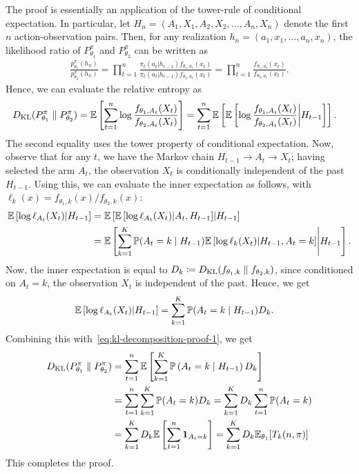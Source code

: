 \documentclass[12pt]{article}
\begin{document}
The proof is essentially an application of the tower-rule of conditional expectation. In particular, let $H_n = (A_1, X_1, A_2, X_2, \ldots, A_n, X_n)$ denote the first $n$ action-observation pairs. Then, for any realization $h_n = (a_1, x_1, \ldots, a_n, x_n)$, the likelihood ratio of $P_{\theta_1}^{\pi}$ and $P_{\theta_2}^{\pi}$ can be written as 
\begin{align}
\frac{p_{\theta_1}^{\pi}(h_n)}{p_{\theta_2}^{\pi}(h_n)} = \prod_{t=1}^n \frac{\pi_t(a_t|h_{t-1}) f_{\theta_1, a_t}(x_t)}{\pi_t(a_t|h_{t-1}) f_{\theta_2, a_t}(x_t)} = \prod_{t=1}^n \frac{f_{\theta_1, a_t}(x_t)}{f_{\theta_2, a_t}(x_t)}. 
\end{align}
Hence, we can evaluate the relative entropy as 
\begin{align}
D_{\text{KL}}(P_{\theta_1}^{\pi} \parallel P_{\theta_2}^{\pi}) &= \mathbb{E}\left[ \sum_{t=1}^n \log  \frac{f_{\theta_1, A_t}(X_t)}{f_{\theta_2, A_t}(X_t)}  \right] 
 = \sum_{t=1}^n \mathbb{E}\left[ \mathbb{E}\left[\log \frac{f_{\theta_1, A_t}(X_t)}{f_{\theta_2, A_t}(X_t)}  \middle \vert H_{t-1} \right] \right].  
 \label{eq:kl-decomposition-proof-1}
\end{align}
The second equality uses the tower property of conditional expectation. Now, observe that for any $t$, we have the Markov chain $H_{t-1} \longrightarrow A_t \longrightarrow X_t$; having selected the arm $A_t$, the observation $X_t$ is conditionally independent of the  past $H_{t-1}$.  Using this, we can evaluate the inner expectation as follows, with $\ell_k(x) = f_{\theta_1, k}(x)/f_{\theta_2, k}(x)$: 
\begin{align}
	\mathbb{E}\left[ \log \ell_{A_t}(X_t) \middle \vert H_{t-1}\right] &= \mathbb{E}\left[ \mathbb{E}\left[ \log \ell_{A_t}(X_t) \middle \vert A_t, H_{t-1} \right] \middle \vert H_{t-1} \right] \\
	&= \mathbb{E} \left[ \sum_{k=1}^K \mathbb{P}(A_t=k \mid H_{t-1}) \mathbb{E}\left[  \log \ell_k(X_t) \middle \vert H_{t-1}, A_t=k\right] \middle  \vert H_{t-1}\right]. 
\end{align}
Now, the inner expectation is equal to $D_k \coloneqq D_{\text{KL}}(f_{\theta_1, k} \parallel f_{\theta_2, k})$, since conditioned on $A_t=k$, the observation $X_t$ is independent of the past. Hence, we get 
\begin{align}
\mathbb{E}\left[ \log \ell_{A_t}(X_t) \middle \vert H_{t-1}\right] &= \sum_{k=1}^K \mathbb{P}(A_t=k \mid H_{t-1}) D_k. 
\end{align}
Combining this with~\eqref{eq:kl-decomposition-proof-1}, we get 
\begin{align}
D_{\text{KL}}(P_{\theta_1}^{\pi} \parallel P_{\theta_2}^{\pi}) & =  \sum_{t=1}^n \mathbb{E}\left[ \sum_{k=1}^K \mathbb{P}\left( A_t=k \mid H_{t-1} \right) D_k \right]\\
&= \sum_{t=1}^n \sum_{k=1}^K \mathbb{P}(A_t=k) D_k 
 = \sum_{k=1}^K D_k \sum_{t=1}^n \mathbb{P}(A_t=k)  \\
 &= \sum_{k=1}^K D_k \mathbb{E}\left[ \sum_{t=1}^n \boldsymbol{1}_{A_t=k} \right] 
 = \sum_{k=1}^K D_k \mathbb{E}_{\theta_1}[T_k(n, \pi)]
\end{align}
This completes the proof. \hfill \qedsymbol
\end{document}
